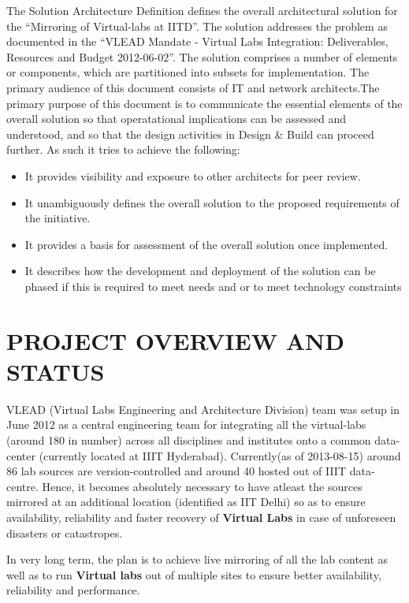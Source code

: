 \documentclass[11pt]{article}
\begin{document}
The Solution Architecture Definition defines the overall
architectural solution for the ``Mirroring of Virtual-labs at
IITD''. The solution addresses the problem as documented in the ``VLEAD
Mandate - Virtual Labs Integration: Deliverables, Resources and Budget
2012-06-02''.  The solution comprises a number of elements
or components, which are partitioned into subsets for
implementation. The primary audience of this document consists of IT
and network architects.The primary purpose of this document is to
communicate the essential elements of the overall solution so that
operatational implications can be assessed and understood, and so that
the design activities in Design \& Build can proceed further.  
As such it tries to achieve the following:
\begin{itemize}
\item It provides visibility and exposure to other architects for peer
  review.
\item It unambiguously defines the overall solution to the proposed
  requirements of the initiative.
\item It provides a basis for assessment of the overall solution once
  implemented.
\item It describes how the development and deployment of the solution can
  be phased if this is required to meet needs and or to meet
  technology constraints
\end{itemize}
\section{PROJECT OVERVIEW AND STATUS}
\label{sec-3}


VLEAD (Virtual Labs Engineering and Architecture Division) team was
setup in June 2012 as a central engineering team for integrating all
the virtual-labs (around 180 in number) across all disciplines and
institutes onto a common data-center (currently located at IIIT
Hyderabad). Currently(as of 2013-08-15) around 86 lab sources are
version-controlled and around 40 hosted out of IIIT
data-centre. Hence, it becomes absolutely necessary to have atleast
the sources mirrored at an additional location (identified as IIT
Delhi) so as to ensure availability, reliability and faster recovery
of \textbf{Virtual Labs} in case of unforeseen disasters or catastropes.

In very long term, the plan is to achieve live mirroring of all the
  lab content as well as to run \textbf{Virtual labs} out of multiple sites
  to ensure better availability, reliability and performance.
\end{document}
